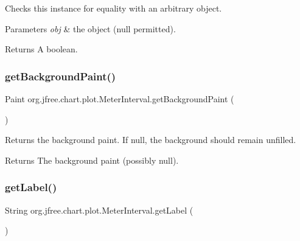Checks this instance for equality with an arbitrary object.


\begin{DoxyParams}{Parameters}
{\em obj} & the object ({\ttfamily null} permitted).\\
\hline
\end{DoxyParams}
\begin{DoxyReturn}{Returns}
A boolean. 
\end{DoxyReturn}
\mbox{\label{classorg_1_1jfree_1_1chart_1_1plot_1_1_meter_interval_a1ebb692861ec8c40c5a3b3882e16fd0a}} 
\subsubsection{\texorpdfstring{get\+Background\+Paint()}{getBackgroundPaint()}}
{\footnotesize\ttfamily Paint org.\+jfree.\+chart.\+plot.\+Meter\+Interval.\+get\+Background\+Paint (\begin{DoxyParamCaption}{ }\end{DoxyParamCaption})}

Returns the background paint. If {\ttfamily null}, the background should remain unfilled.

\begin{DoxyReturn}{Returns}
The background paint (possibly {\ttfamily null}). 
\end{DoxyReturn}
\mbox{\label{classorg_1_1jfree_1_1chart_1_1plot_1_1_meter_interval_a4eb9f7270ace06134402dc95dece1799}} 
\subsubsection{\texorpdfstring{get\+Label()}{getLabel()}}
{\footnotesize\ttfamily String org.\+jfree.\+chart.\+plot.\+Meter\+Interval.\+get\+Label (\begin{DoxyParamCaption}{ }\end{DoxyParamCaption})}

